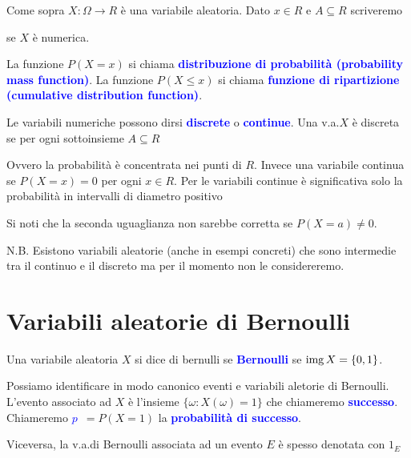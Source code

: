 \documentclass[12pt,openany]{book}
\def\range{\mathop{\rm img}}
\def\emph#1{\textcolor{blue}{\textbf{\boldmath #1}}}
\theoremstyle{mio}
\theoremstyle{liscio}
\begin{document}
Come sopra $X:\Omega\to R$ è una variabile aleatoria. Dato $x\in R$ e $A\subseteq R$ scriveremo

\ceq{\hfill \emph{$p_x$}\medrel{=}\emph{$P(X=x)$}}{=}{P\big(\{\omega\in\Omega\ :\ X(\omega)=x)\}\big)}

\ceq{\hfill \emph{$P(X\in A)$}}{=}{P\big(\{\omega\in\Omega\ :\ X(\omega)\in A)\}\big)}

\ceq{\hfill \emph{$P(X \le x$)}}{=}{P\big(\{\omega\in\Omega\ :\ X(\omega)\le x)\}\big)}\hfill  se $X$ \`e numerica.

La funzione $P(X=x)$ si chiama \emph{distribuzione di probabilità (probability mass function)}. La funzione $P(X \le x)$ si chiama  \emph{funzione di ripartizione (cumulative distribution function)}.

Le variabili numeriche possono dirsi \emph{discrete\/} o \emph{continue}. Una v.a.\@ $X$ è discreta se per ogni sottoinsieme $A\subseteq R$


Ovvero la probabilità è concentrata nei punti di $R$. Invece una variabile continua se $P(X{=}x)=0$ per ogni $x\in R$. Per le variabili continue è significativa solo la probabilità in intervalli di diametro positivo



Si noti che la seconda uguaglianza non sarebbe corretta se $P(X{=}a)\neq0$.

N.B. Esistono variabili aleatorie (anche in esempi concreti) che sono intermedie tra il continuo e il discreto ma per il momento non le considereremo.



\clearpage\section{Variabili aleatorie di Bernoulli}

Una variabile aleatoria $X$ si dice di bernulli se \emph{Bernoulli\/} se $\range X=\{0,1\}$.

Possiamo identificare in modo canonico eventi e variabili aletorie di Bernoulli. L'evento associato ad $X$ è l'insieme $\{\omega:X(\omega)=1\}$ che chiameremo \emph{successo}. Chiameremo \emph{$p$}\ $ = P(X{=}1)$ la \emph{probabilità di successo}.

Viceversa, la v.a.\@ di Bernoulli associata ad un evento $E$ è spesso denotata con $1_E$
\end{document}
